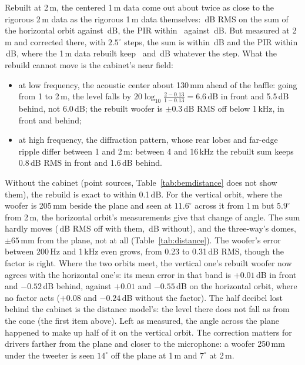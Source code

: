 \documentclass[11pt,a4paper]{article}
\begin{document}
Rebuilt at 2\,m, the centered 1\,m data come out about twice as close to the rigorous 2\,m data as the
rigorous 1\,m data themselves: \distOneTwoRebSys\,dB RMS on the sum of the horizontal orbit against
\distOneTwoAsIsSys\,dB, the PIR within \distOneTwoRebPir\ against \distOneTwoAsIsPir\,dB. But measured at
2\,m and corrected there, with $2.5^\circ$ steps, the sum is within \distOneTwoThereFineSys\,dB and the PIR
within \distOneTwoThereFinePir\,dB, where the 1\,m data rebuilt keep \distOneTwoRebFineSys\ and
\distOneTwoRebFinePir\,dB whatever the step. What the rebuild cannot move is the cabinet's near field:
\begin{itemize}
  \item at low frequency, the acoustic center about 130\,mm ahead of the baffle: going from 1 to 2\,m, the
  level falls by $20\log_{10}\frac{2-0.13}{1-0.13}=6.6$\,dB in front and 5.5\,dB behind, not 6.0\,dB;
  the rebuilt woofer is $\pm0.3$\,dB RMS off below 1\,kHz, in front and behind;
  \item at high frequency, the diffraction pattern, whose rear lobes and far-edge ripple differ between
  1 and 2\,m: between 4 and 16\,kHz the rebuilt sum keeps 0.8\,dB RMS in front and 1.6\,dB behind.
\end{itemize}
Without the cabinet (point sources, Table~\ref{tab:bemdistance} does not show them), the rebuild is exact
to within 0.1\,dB. For the vertical orbit, where the woofer is 205\,mm beside the plane and seen at
$11.6^\circ$ across it from 1\,m but $5.9^\circ$ from 2\,m, the horizontal orbit's measurements give that
change of angle. The sum hardly moves (\distOneTwoRebVSys\,dB RMS off with them,
\distOneTwoPlainVSys\,dB without), and the three-way's domes, $\pm65$\,mm from the plane, not at all
(Table~\ref{tab:distance}). The woofer's error between 200\,Hz and 1\,kHz even grows, from 0.23 to
0.31\,dB RMS, though the factor is right. Where the two orbits meet, the vertical one's rebuilt woofer now
agrees with the horizontal one's: its mean error in that band is $+0.01$\,dB in front and $-0.52$\,dB
behind, against $+0.01$ and $-0.55$\,dB on the horizontal orbit, where no factor acts ($+0.08$ and
$-0.24$\,dB without the factor). The half decibel lost behind the cabinet is the distance model's: the
level there does not fall as from the cone (the first item above). Left as measured, the angle across the
plane happened to make up half of it on the vertical orbit. The correction matters for drivers farther from the plane and closer to the microphone: a
woofer 250\,mm under the tweeter is seen $14^\circ$ off the plane at 1\,m and $7^\circ$ at 2\,m.
\end{document}
